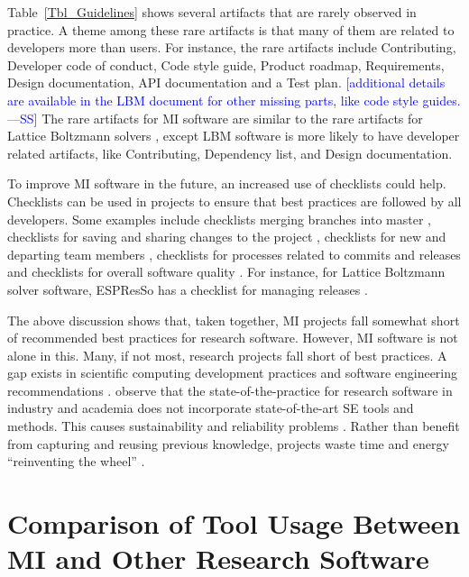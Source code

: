 \documentclass[final, 3p, times, authoryear]{elsarticle}
\newcommand{\authornote}[3]{\textcolor{#1}{[#3 ---#2]}}
\newcommand{\authornote}[3]{}
\newcommand{\wss}[1]{\authornote{blue}{SS}{#1}} %
\begin{document}
Table~\ref{Tbl_Guidelines} shows several artifacts that are rarely observed in
practice.  A theme among these rare artifacts is that many of them are related
to developers more than users.  For instance, the rare artifacts include
Contributing, Developer code of conduct, Code style guide, Product roadmap,
Requirements, Design documentation, API documentation and a Test plan.
\wss{additional details are available in the LBM document for other missing
parts, like code style guides.}  The rare artifacts for MI software are similar
to the rare artifacts for Lattice Boltzmann solvers \citep{Michalski2021},
except LBM software is more likely to have developer related artifacts, like
Contributing, Dependency list, and Design documentation.

To improve MI software in the future, an increased use of checklists could help.
Checklists can be used in projects to ensure that best practices are followed by
all developers.  Some examples include checklists merging branches into master
\citep{Brown2015}, checklists for saving and sharing changes to the project
\citep{WilsonEtAl2016}, checklists for new and departing team members
\citep{HerouxAndBernholdt2018}, checklists for processes related to commits and
releases \citep{HerouxEtAl2008} and checklists for overall software quality
\citep{ThielEtAl2020, SSI2022}.  For instance, for Lattice Boltzmann solver
software, ESPResSo has a checklist for managing releases \citep{Michalski2021}. 

The above discussion shows that, taken together, MI projects fall somewhat short
of recommended best practices for research software.  However, MI software is
not alone in this.  Many, if not most, research projects fall short of best
practices.  A gap exists in scientific computing development practices and
software engineering recommendations \citep{Storer2017, Kelly2007,
OwojaiyeEtAl2021_CSE}. \citet{JohansonAndHasselbring2018} observe that the
state-of-the-practice for research software in industry and academia does not incorporate
state-of-the-art SE tools and methods.  This causes sustainability and
reliability problems \citep{FaulkEtAl2009}. Rather than benefit from capturing
and reusing previous knowledge, projects waste time and energy ``reinventing the
wheel'' \citep{deSouzaEtAl2019}.

\section{Comparison of Tool Usage Between MI and Other Research Software}
\label{Sec_CompareTools}
\end{document}
